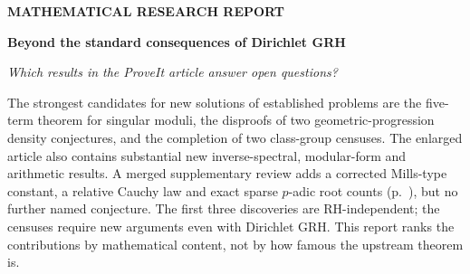 \documentclass[11pt,letterpaper]{article}
\begin{document}
\enlargethispage{\baselineskip}
{\sffamily\color{lake}\footnotesize\bfseries MATHEMATICAL RESEARCH REPORT}\par
\vspace{8pt}
{\raggedright\sffamily\color{ink}\bfseries\fontsize{29}{32}\selectfont Beyond the standard consequences of Dirichlet GRH\par}
\vspace{3pt}
{\large\itshape Which results in the ProveIt article answer open questions?}\par
\vspace{7pt}
The strongest candidates for new solutions of established problems are the five-term theorem for singular moduli, the disproofs of two geometric-progression density conjectures, and the completion of two class-group censuses. The enlarged article also contains substantial new inverse-spectral, modular-form and arithmetic results. A merged supplementary review adds a corrected Mills-type constant, a relative Cauchy law and exact sparse $p$-adic root counts (p.~\pageref{supprank}), but no further named conjecture. The first three discoveries are RH-independent; the censuses require new arguments even with Dirichlet GRH. This report ranks the contributions by mathematical content, not by how famous the upstream theorem is.
\end{document}
